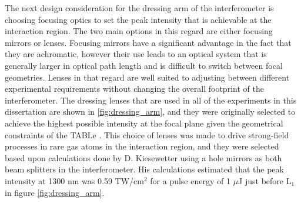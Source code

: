 The next design consideration for the dressing arm of the interferometer is choosing focusing optics to set the peak intensity that is achievable at the interaction region.  The two main options in this regard are either focusing mirrors or lenses.  Focusing mirrors have a significant advantage in the fact that they are achromatic, however their use leads to an optical system that is generally larger in optical path length and is difficult to switch between focal geometries. Lenses in that regard are well suited to adjusting between different experimental requirements without changing the overall footprint of the interferometer.  The dressing lenses that are used in all of the experiments in this dissertation are shown in \ref{fig:dressing_arm}, and they were originally selected to achieve the highest possible intensity at the focal plane given the geometrical constraints of the TABLe \cite{kiesewetterDynamicsNearThresholdAttosecond2019}. This choice of lenses was made to drive strong-field processes in rare gas atoms in the interaction region, and they were selected based upon calculations done by D. Kiesewetter using a hole mirrors as both beam splitters in the interferometer. His calculations estimated that the peak intensity at 1300 nm was 0.59 TW/cm$^2$ for a pulse energy of 1 $\mu$J just before L$_1$ in figure \ref{fig:dressing_arm}.

